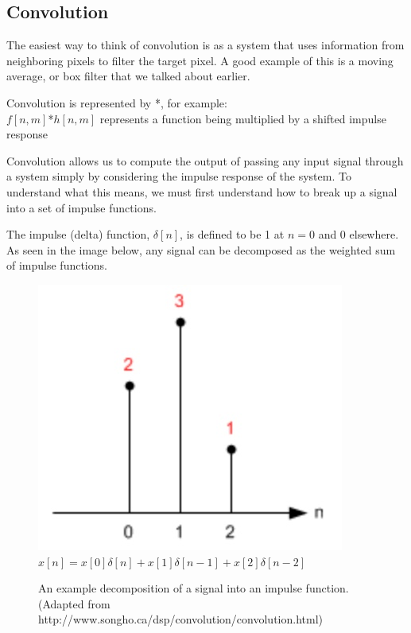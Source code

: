 \documentclass{article}
\begin{document}
\subsection{Convolution}

The easiest way to think of convolution is as a system that uses information from neighboring pixels to filter the target pixel. A good example of this is a moving average, or box filter that we talked about earlier.

Convolution is represented by *, for example: \\
$f[n,m]$*$h[n,m]$
represents a function being multiplied by a shifted impulse response


Convolution allows us to compute the output of passing any input signal through a system simply by considering the impulse response of the system. To understand what this means, we must first understand how to break up a signal into a set of impulse functions.

The impulse (delta) function, $\delta [n]$, is defined to be 1 at $n = 0$ and 0 elsewhere. As seen in the image below, any signal can be decomposed as the weighted sum of impulse functions.



\begin{figure}[h!]
\begin{center}
\includegraphics[scale=0.4]{input_signal_.jpeg} \\
$x[n] = x[0]\delta [n] + x[1]\delta [n-1] + x[2]\delta [n-2]$ \\
\caption{An example decomposition of a signal into an impulse function. (Adapted from http://www.songho.ca/dsp/convolution/convolution.html)}
\end{center}
\end{figure}
\end{document}
